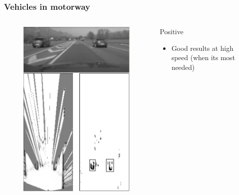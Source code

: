 \documentclass{beamer}
\begin{document}
	\begin{frame}
		\frametitle{Vehicles in motorway}
		\begin{columns}[t]
			\begin{column}[t]{5cm}
				\begin{figure}[h]
				\center
				\includegraphics[scale=0.55]{../img/fig:result:scenetwocarshighway}
				\end{figure}
			\end{column}
			\begin{column}[t]{5cm}
				\begin{exampleblock}{Positive}
				\begin{itemize}
				\item Good results at high speed (when its most needed)
				\end{itemize}
				\end{exampleblock}
			\end{column}
		\end{columns}		

	\end{frame}
\end{document}
